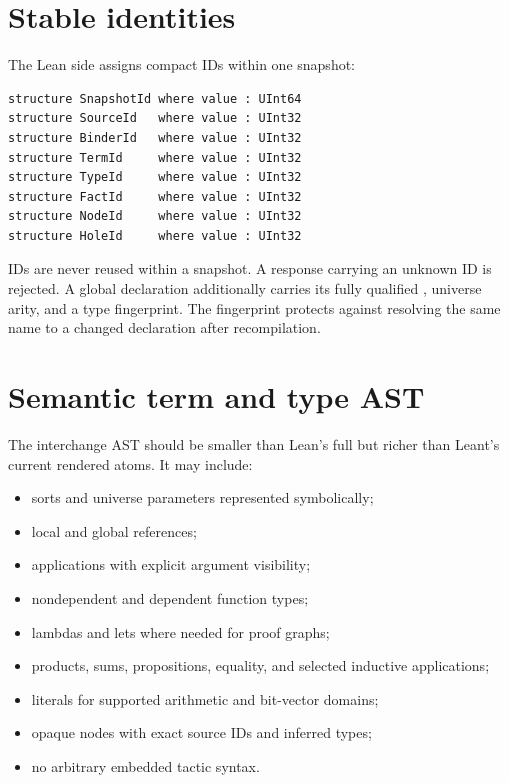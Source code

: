 \documentclass[11pt,letterpaper,openany]{report}
\newcommand{\code}[1]{\texttt{\detokenize{#1}}}
\begin{document}
\section{Stable identities}

The Lean side assigns compact IDs within one snapshot:

\begin{lstlisting}[language=LeanFour,caption={Schematic identity types}]
structure SnapshotId where value : UInt64
structure SourceId   where value : UInt32
structure BinderId   where value : UInt32
structure TermId     where value : UInt32
structure TypeId     where value : UInt32
structure FactId     where value : UInt32
structure NodeId     where value : UInt32
structure HoleId     where value : UInt32
\end{lstlisting}

IDs are never reused within a snapshot. A response carrying an unknown ID is rejected.
A global declaration additionally carries its fully qualified \code{Name}, universe
arity, and a type fingerprint. The fingerprint protects against resolving the same
name to a changed declaration after recompilation.

\section{Semantic term and type AST}

The interchange AST should be smaller than Lean's full \code{Expr} but richer than
Leant's current rendered atoms. It may include:

\begin{itemize}
  \item sorts and universe parameters represented symbolically;
  \item local and global references;
  \item applications with explicit argument visibility;
  \item nondependent and dependent function types;
  \item lambdas and lets where needed for proof graphs;
  \item products, sums, propositions, equality, and selected inductive applications;
  \item literals for supported arithmetic and bit-vector domains;
  \item opaque nodes with exact source IDs and inferred types;
  \item no arbitrary embedded tactic syntax.
\end{itemize}
\end{document}
